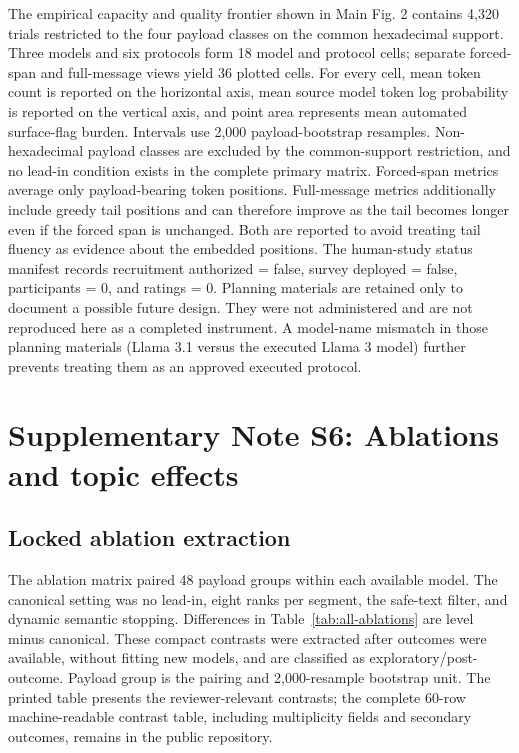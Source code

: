 \documentclass[fleqn,10pt]{wlscirep}
\begin{document}
The empirical capacity and quality frontier shown in Main Fig. 2 contains 4,320 trials restricted to the four payload classes on the common hexadecimal support. Three models and six protocols form 18 model and protocol cells; separate forced-span and full-message views yield 36 plotted cells. For every cell, mean token count is reported on the horizontal axis, mean source model token log probability is reported on the vertical axis, and point area represents mean automated surface-flag burden. Intervals use 2,000 payload-bootstrap resamples. Non-hexadecimal payload classes are excluded by the common-support restriction, and no lead-in condition exists in the complete primary matrix.
Forced-span metrics average only payload-bearing token positions. Full-message metrics additionally include greedy tail positions and can therefore improve as the tail becomes longer even if the forced span is unchanged. Both are reported to avoid treating tail fluency as evidence about the embedded positions.
The human-study status manifest records recruitment authorized = false, survey deployed = false, participants = 0, and ratings = 0. Planning materials are retained only to document a possible future design. They were not administered and are not reproduced here as a completed instrument. A model-name mismatch in those planning materials (Llama 3.1 versus the executed Llama 3 model) further prevents treating them as an approved executed protocol.


\section*{Supplementary Note S6: Ablations and topic effects}\label{si:s6}

\subsection*{Locked ablation extraction}

The ablation matrix paired 48 payload groups within each available model. The canonical setting was no lead-in, eight ranks per segment, the safe-text filter, and dynamic semantic stopping. Differences in Table~\ref{tab:all-ablations} are level minus canonical. These compact contrasts were extracted after outcomes were available, without fitting new models, and are classified as exploratory/post-outcome. Payload group is the pairing and 2,000-resample bootstrap unit. The printed table presents the reviewer-relevant contrasts; the complete 60-row machine-readable contrast table, including multiplicity fields and secondary outcomes, remains in the public repository.
\end{document}
